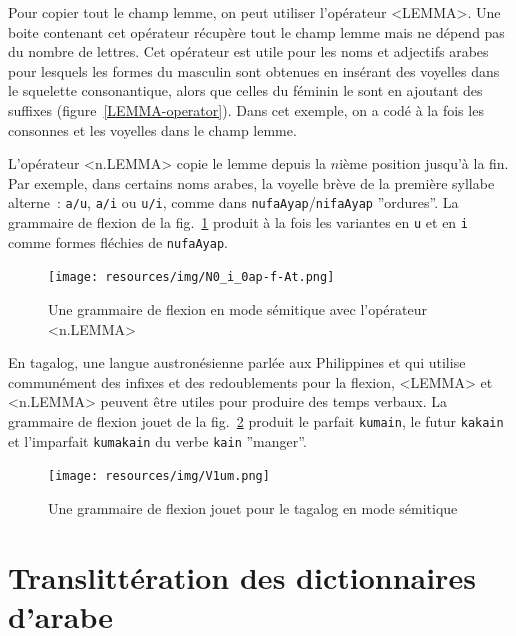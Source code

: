 \bigskip
\noindent Pour copier tout le champ lemme, on peut utiliser l'opérateur <LEMMA>.
Une boite contenant cet opérateur récupère tout le champ lemme mais ne dépend pas du nombre de lettres.
Cet opérateur est utile pour les noms et adjectifs arabes pour lesquels les formes du masculin sont obtenues en
insérant des voyelles dans le squelette consonantique, alors que celles du féminin le sont en ajoutant des
suffixes (figure~\ref{LEMMA-operator}). Dans cet exemple, on a codé à la fois les consonnes et les voyelles
dans le champ lemme.

\bigskip
\noindent L'opérateur <n.LEMMA>  copie le lemme depuis la $n$ième position jusqu'à la fin.
Par exemple, dans certains noms arabes, la voyelle brève de la première syllabe alterne~:
\verb+a/u+, \verb+a/i+ ou \verb+u/i+, comme dans \verb+nufaAyap+/\verb+nifaAyap+ ''ordures''.
La grammaire de flexion de la fig.~\ref{n.LEMMA-operator} produit à la fois les variantes en \verb+u+ et en  \verb+i+
comme formes fléchies de \verb+nufaAyap+.

\begin{figure}[!ht]
\begin{center}
\texttt{[image: resources/img/N0\_i\_0ap-f-At.png]}
\caption{Une grammaire de flexion en mode sémitique avec l'opérateur <n.LEMMA>\label{n.LEMMA-operator}}
\end{center}
\end{figure}

\bigskip
\noindent En tagalog, une langue austronésienne parlée aux Philippines et qui utilise communément des infixes
et des redoublements pour la flexion, <LEMMA> et <n.LEMMA> peuvent être utiles pour produire des temps verbaux.
La grammaire de flexion jouet de la fig.~\ref{tagalog} produit le parfait \verb+kumain+, le futur \verb+kakain+
et l'imparfait \verb+kumakain+ du verbe \verb+kain+ ''manger''.

\begin{figure}[!ht]
\begin{center}
\texttt{[image: resources/img/V1um.png]}
\caption{Une grammaire de flexion jouet pour le tagalog en mode sémitique\label{tagalog}}
\end{center}
\end{figure}

\section{Translittération des dictionnaires d'arabe}
\label{transliteration-Arabic}

